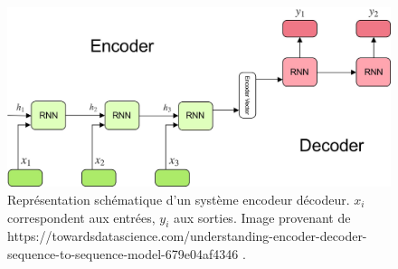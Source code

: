 \begin{figure}[h]
  \centering
  \includegraphics[width=14cm]{./Chapitre3/figures/encoder.jpeg}
  \caption{Représentation schématique d'un système encodeur décodeur. $x_i$ correspondent aux entrées, $y_i$ aux sorties. Image provenant de https://towardsdatascience.com/understanding-encoder-decoder-sequence-to-sequence-model-679e04af4346 .}
  \label{fig:encoder}
\end{figure}

